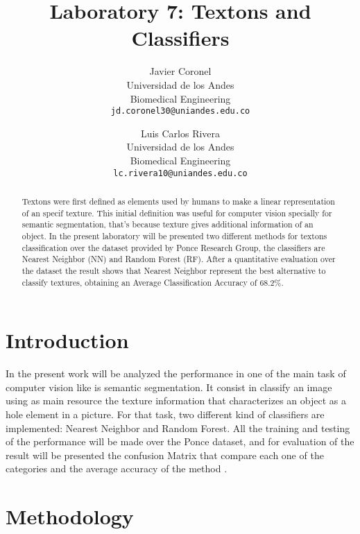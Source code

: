 \documentclass[10pt,twocolumn,letterpaper]{article}
\begin{document}
\title{Laboratory 7: Textons and Classifiers}

\author{Javier Coronel\\
Universidad de los Andes\\
Biomedical Engineering\\
{\tt\small jd.coronel30@uniandes.edu.co}
\and
Luis Carlos Rivera \\
Universidad de los Andes\\
Biomedical Engineering\\
{\tt\small lc.rivera10@uniandes.edu.co}
}

\maketitle

\begin{abstract}
Textons were first defined as elements used by humans to make a linear representation of an specif texture. This initial definition was useful for computer vision specially for semantic segmentation, that's because texture gives additional information of an object. In the present laboratory will be presented two different methods for textons classification over the dataset provided by Ponce Research Group, the classifiers are Nearest Neighbor (NN) and Random Forest (RF). After a quantitative evaluation over the dataset the result shows that Nearest Neighbor represent the best alternative to classify textures, obtaining an Average Classification Accuracy of 68.2\%.
\end{abstract}

\section{Introduction}
In the present work will be analyzed the performance in one of the main task of computer vision like is semantic segmentation. It consist in classify an image using as main resource the texture information that characterizes an object as a hole element in a picture. For that task, two different kind of classifiers are implemented: Nearest Neighbor and Random Forest. All the training and testing of the performance will be made over the Ponce dataset, and for evaluation of the result will be presented the confusion Matrix that compare each one of the categories and the average accuracy of the method \cite{julesz1981textons}\cite{shotton2006textonboost}.  
\section{Methodology}
\end{document}
